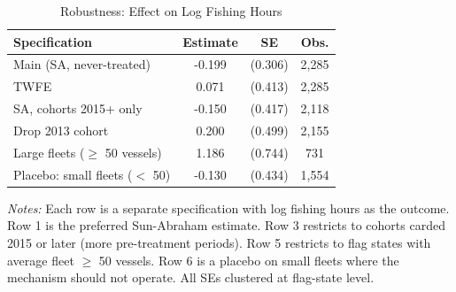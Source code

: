 \begin{table}[t]
\centering
\caption{Robustness: Effect on Log Fishing Hours}
\label{tab:robustness}
\begin{threeparttable}
\begin{tabular}{lccc}
\toprule
Specification & Estimate & SE & Obs. \\
\midrule
Main (SA, never-treated) & -0.199 & (0.306) & 2,285 \\
TWFE & 0.071 & (0.413) & 2,285 \\
SA, cohorts 2015+ only & -0.150 & (0.417) & 2,118 \\
Drop 2013 cohort & 0.200 & (0.499) & 2,155 \\
Large fleets ($\geq$ 50 vessels) & 1.186 & (0.744) & 731 \\
Placebo: small fleets ($<$ 50) & -0.130 & (0.434) & 1,554 \\
\bottomrule
\end{tabular}
\begin{tablenotes}[flushleft]
\small
\item \textit{Notes:} Each row is a separate specification with log fishing hours as the outcome. Row 1 is the preferred Sun-Abraham estimate. Row 3 restricts to cohorts carded 2015 or later (more pre-treatment periods). Row 5 restricts to flag states with average fleet $\geq$ 50 vessels. Row 6 is a placebo on small fleets where the mechanism should not operate. All SEs clustered at flag-state level.
\end{tablenotes}
\end{threeparttable}
\end{table}
